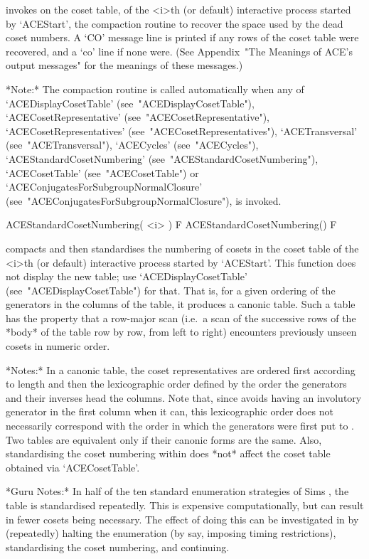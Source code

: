 invokes on the coset table, of  the  <i>th  (or  default)  interactive
{\ACE} process  started  by  `ACEStart',  the  compaction  routine  to
recover the space used by  the  dead  coset  numbers. A `CO' message line is printed if any  rows  of  the  coset
table were recovered, and a `co' line if none were. (See Appendix~"The
Meanings  of  ACE's  output  messages"  for  the  meanings  of   these
messages.)

*Note:*
The  compaction  routine  is  called   automatically   when   any   of
`ACEDisplayCosetTable'                   (see~"ACEDisplayCosetTable"),
`ACECosetRepresentative'               (see~"ACECosetRepresentative"),
`ACECosetRepresentatives'             (see~"ACECosetRepresentatives"),
`ACETransversal'          (see~"ACETransversal"),          `ACECycles'
(see~"ACECycles"),                         `ACEStandardCosetNumbering'
(see~"ACEStandardCosetNumbering"),                     `ACECosetTable'
(see~"ACECosetTable")    or    `ACEConjugatesForSubgroupNormalClosure'
(see~"ACEConjugatesForSubgroupNormalClosure"), is invoked.

\>ACEStandardCosetNumbering( <i> ) F
\>ACEStandardCosetNumbering() F

compacts and then standardises the numbering of cosets  in  the  coset
table of the <i>th (or default) interactive {\ACE} process started  by
`ACEStart'.  This  function  does  not  display  the  new  table;  use
`ACEDisplayCosetTable' (see~"ACEDisplayCosetTable") for that. That is,
for a given ordering of the generators in the columns of the table, it
produces a canonic table.  Such  a  table  has  the  property  that  a
row-major scan (i.e.~a scan of the successive rows of  the  *body*  of
the table row by row, from left to right) encounters previously unseen
cosets in numeric order.

*Notes:*
In a canonic  table,  the  coset  representatives  are  ordered  first
according to length and then the lexicographic order  defined  by  the
order the generators and their inverses head the columns.  Note  that,
since {\ACE} avoids having an involutory generator in the first column
when it can, this lexicographic order does not necessarily  correspond
with the order in which the generators were first put to  {\ACE}.  Two
tables are equivalent only if their canonic forms are the same.  Also,
standardising the coset numbering within {\ACE} does *not* affect  the
{\GAP} coset table obtained via `ACECosetTable'.

*Guru Notes:*
In  half  of  the  ten  standard  enumeration   strategies   of   Sims
\cite{Sim94}, the table is standardised repeatedly. This is  expensive
computationally, but can result in fewer cosets being  necessary.  The
effect of doing this can be investigated  in  {\ACE}  by  (repeatedly)
halting  the  enumeration  (by  say,  imposing  timing  restrictions),
standardising the coset numbering, and continuing.

